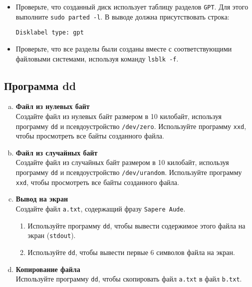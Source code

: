 \documentclass{article}
\begin{document}
\begin{itemize}
\item Проверьте, что созданный диск использует таблицу разделов \texttt{GPT}. Для этого выполните \texttt{sudo parted -l}. В выводе должна присутствовать строка:
\begin{lstlisting}
Disklabel type: gpt
\end{lstlisting}
\item Проверьте, что все разделы были созданы вместе с соответствующими файловыми системами, используя команду \texttt{lsblk -f}.
\end{itemize}

\subsection{Программа dd}

\begin{enumerate}[a.]
\item \textbf{Файл из нулевых байт}\\
Создайте файл из нулевых байт размером в 10 килобайт, используя программу \texttt{dd} и псевдоустройство \texttt{/dev/zero}. Используйте программу \texttt{xxd}, чтобы просмотреть все байты созданного файла.

\item \textbf{Файл из случайных байт}\\
Создайте файл из случайных байт размером в 10 килобайт, используя программу \texttt{dd} и псевдоустройство \texttt{/dev/urandom}. Используйте программу \texttt{xxd}, чтобы просмотреть все байты созданного файла.

\item \textbf{Вывод на экран}\\
Создайте файл \texttt{a.txt}, содержащий фразу \texttt{Sapere Aude}.
\begin{enumerate}
\item Используйте программу \texttt{dd}, чтобы вывести содержимое этого файла на экран (\texttt{stdout}).
\item Используйте \texttt{dd}, чтобы вывести первые 6 символов файла на экран.
\end{enumerate}

\item \textbf{Копирование файла}\\
Используйте программу \texttt{dd}, чтобы скопировать файл \texttt{a.txt} в файл \texttt{b.txt}.
\end{enumerate}


\iffalse
\newpage
~
\newpage

\subsection*{Идеи}
\begin{itemize}
\item Вопросы по ext2
\begin{itemize}
\item Сколько памяти может занимать 1 файл в ext2 (block=4kb, размер указателя = 4 или 8).
\end{itemize}
\end{itemize}


\fi
\end{document}
